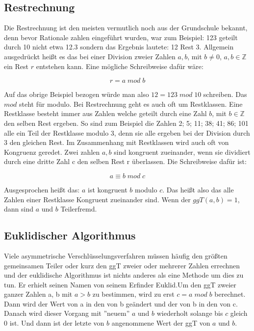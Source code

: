 \documentclass[a4paper,12pt,titlepage]{article}
\begin{document}
\subsection{Restrechnung}
Die Restrechnung ist den meisten vermutlich noch aus der Grundschule bekannt, denn bevor Rationale zahlen eingeführt wurden, war zum Beispiel: 123 geteilt durch 10 nicht etwa 12.3 sondern das Ergebnis lautete: 12 Rest 3. Allgemein ausgedrückt heißt es das bei einer Division zweier Zahlen $a,b$, mit $b \neq 0$, $a,b \in \mathbb{Z}$ ein Rest $r$ entstehen kann. Eine mögliche Schreibweise dafür wäre: \newline
\begin{center}
\[r = a \; mod \; b\]
\end{center}
Auf das obrige Beispiel bezogen würde man also $12 = 123 \; mod \; 10$ schreiben. Das $mod$ steht für modulo. \newline Bei Restrechnung geht es auch oft um Restklassen. Eine Restklasse besteht immer aus Zahlen welche geteilt durch eine Zahl $b$, mit $b \in \mathbb{Z}$ den selben Rest ergeben. So sind zum Beispiel die Zahlen 2; 5; 11; 38; 41; 86; 101 alle ein Teil der Restklasse modulo 3, denn sie alle ergeben bei der Division durch 3 den gleichen Rest. Im Zusammenhang mit Restklassen wird auch oft von Kongruenz geredet. Zwei zahlen $a, b$ sind kongruent zueinander, wenn sie dividiert durch eine dritte Zahl c den selben Rest r überlassen. Die Schreibweise dafür ist: \newline
 \begin{center}
\[a \equiv b \; mod \; c\]
 \end{center}
Ausgesprochen heißt das: $a$ ist kongruent $b$ modulo $c$. 
Das heißt also das alle Zahlen einer Restklasse Kongruent zueinander sind.
Wenn der $ggT(a, b) = 1$, dann sind $a$ und $b$ Teilerfremd.
 
\subsection{Euklidischer Algorithmus}
Viele asymmetrische Verschlüsselungsverfahren müssen häufig den größten gemeinsamen Teiler oder kurz den ggT zweier oder mehrerer Zahlen errechnen und der euklidische Algorithmus ist nichts anderes als eine Methode um dies zu tun. Er erhielt seinen Namen von seinem Erfinder Euklid.\newline Um den ggT zweier ganzer Zahlen a, b mit $a > b$ zu bestimmen, wird zu erst $c = a \; mod \; b$ berechnet. Dann wird der Wert von a in den von b geändert und der von b in den von c. Danach wird dieser Vorgang mit ''neuem'' $a$ und $b$ wiederholt solange bis $c$ gleich 0 ist. Und dann ist der letzte von $b$ angenommene Wert der ggT von $a$ und $b$.
\end{document}
